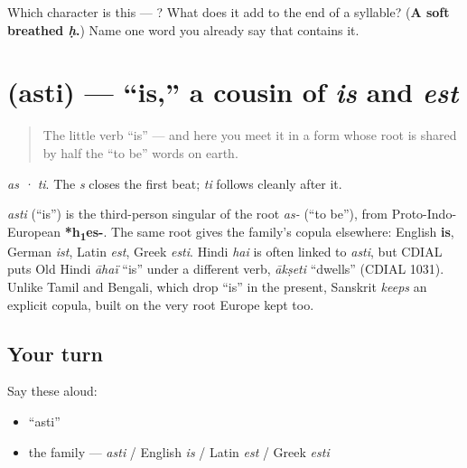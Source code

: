 \begin{tcolorbox}[breakable,colback=teal!4,colframe=teal!35!black,title={Before you move on}]
Which character is this — ? What does it add to the end of a syllable? (\textbf{A soft breathed \emph{ḥ}.}) Name one word you already say that contains it.
\end{tcolorbox}
\section[\texorpdfstring{\sk{अस्ति} (asti)}{अस्ति (asti)}]{ (asti) — \textquotedblleft{}is,\textquotedblright{} a cousin of \emph{is} and \emph{est}}

\label{lesson:SA-C02-asti}



\begin{quote}
The little verb \textquotedblleft{}is\textquotedblright{} — and here you meet it in a form whose root is shared by half the \textquotedblleft{}to be\textquotedblright{} words on earth.
\end{quote}

\begin{sounds}
\emph{as · ti}. The \emph{s} closes the first beat; \emph{ti} follows cleanly after it.
\end{sounds}

\begin{cousinweb}
\emph{asti} (\textquotedblleft{}is\textquotedblright{}) is the third-person singular of the root \emph{as-} (\textquotedblleft{}to be\textquotedblright{}), from Proto-Indo-European \textbf{*h\textsubscript{1}es-}. The same root gives the family's copula elsewhere: English \textbf{is}, German \emph{ist}, Latin \emph{est}, Greek \emph{esti}. Hindi \emph{hai} is often linked to \emph{asti}, but CDIAL puts Old Hindi \emph{āhaï} \textquotedblleft{}is\textquotedblright{} under a different verb, \emph{ākṣeti} \textquotedblleft{}dwells\textquotedblright{} (CDIAL 1031). Unlike Tamil and Bengali, which drop \textquotedblleft{}is\textquotedblright{} in the present, Sanskrit \emph{keeps} an explicit copula, built on the very root Europe kept too.
\end{cousinweb}

\subsection*{Your turn}
Say these aloud:

\begin{itemize}
\raggedright
  \item \textquotedblleft{}asti\textquotedblright{}
  \item the family — \emph{asti} / English \emph{is} / Latin \emph{est} / Greek \emph{esti}
\end{itemize}

